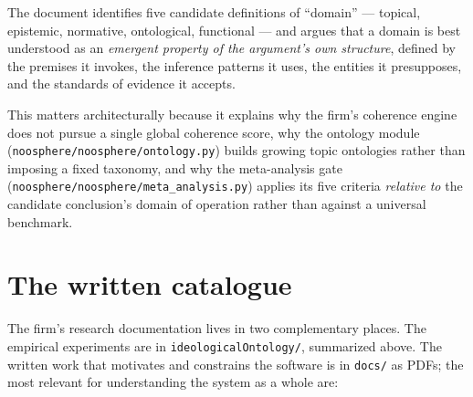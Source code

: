 \documentclass[11pt,letterpaper]{article}
\newcommand{\file}[1]{\texttt{#1}}
\begin{document}
The document identifies five candidate definitions of ``domain'' --- topical, epistemic, normative, ontological, functional --- and argues that a domain is best understood as an \emph{emergent property of the argument's own structure}, defined by the premises it invokes, the inference patterns it uses, the entities it presupposes, and the standards of evidence it accepts.

This matters architecturally because it explains why the firm's coherence engine does not pursue a single global coherence score, why the ontology module (\file{noosphere/noosphere/ontology.py}) builds growing topic ontologies rather than imposing a fixed taxonomy, and why the meta-analysis gate (\file{noosphere/noosphere/meta\_analysis.py}) applies its five criteria \emph{relative to} the candidate conclusion's domain of operation rather than against a universal benchmark.

\section{The written catalogue}

The firm's research documentation lives in two complementary places. The empirical experiments are in \file{ideologicalOntology/}, summarized above. The written work that motivates and constrains the software is in \file{docs/} as PDFs; the most relevant for understanding the system as a whole are:
\end{document}

